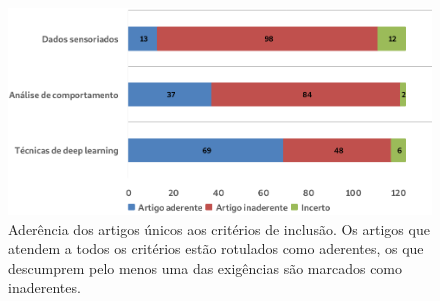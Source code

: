 \documentclass[10pt,journal,compsoc]{IEEEtran}
\begin{document}
\begin{figure}
\centering
\includegraphics[scale=0.25]{distribuicao_selecao}
\caption{Aderência dos artigos únicos aos critérios de inclusão. Os
  artigos que atendem a todos os critérios estão
  rotulados como aderentes, os que descumprem pelo menos
  uma das exigências são marcados como inaderentes.}
\label{fig:distselecao}
\end{figure}
\end{document}
